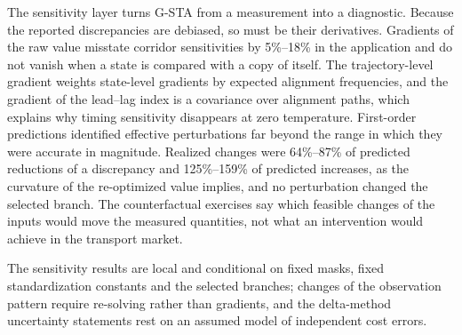 
The sensitivity layer turns G-STA from a measurement into a diagnostic. Because the reported discrepancies are debiased, so must be their derivatives. Gradients of the raw value misstate corridor sensitivities by 5\%--18\% in the application and do not vanish when a state is compared with a copy of itself. The trajectory-level gradient weights state-level gradients by expected alignment frequencies, and the gradient of the lead--lag index is a covariance over alignment paths, which explains why timing sensitivity disappears at zero temperature. First-order predictions identified effective perturbations far beyond the range in which they were accurate in magnitude. Realized changes were 64\%--87\% of predicted reductions of a discrepancy and 125\%--159\% of predicted increases, as the curvature of the re-optimized value implies, and no perturbation changed the selected branch. The counterfactual exercises say which feasible changes of the inputs would move the measured quantities, not what an intervention would achieve in the transport market.

 The sensitivity results are local and conditional on fixed masks, fixed standardization constants and the selected branches; changes of the observation pattern require re-solving rather than gradients, and the delta-method uncertainty statements rest on an assumed model of independent cost errors.
